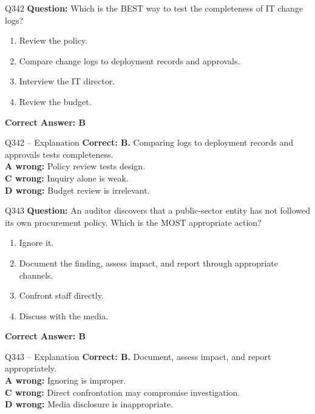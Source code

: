 \documentclass[aspectratio=169,10pt]{beamer}
\begin{document}
	\begin{frame}[t]{Q342}
		\small
		\textbf{Question:} Which is the BEST way to test the completeness of IT change logs?
		\begin{enumerate}[label=\Alph*.,itemsep=1pt,topsep=2pt]
			\item Review the policy.
			\item Compare change logs to deployment records and approvals.
			\item Interview the IT director.
			\item Review the budget.
		\end{enumerate}
		\vspace{4pt}
		\textbf{Correct Answer: B}
	\end{frame}
	
	\begin{frame}[t]{Q342 -- Explanation}
		\small
		\textbf{Correct: B.} Comparing logs to deployment records and approvals tests completeness. \\[4pt]
		\textbf{A wrong:} Policy review tests design. \\[2pt]
		\textbf{C wrong:} Inquiry alone is weak. \\[2pt]
		\textbf{D wrong:} Budget review is irrelevant.
	\end{frame}
	
	\begin{frame}[t]{Q343}
		\small
		\textbf{Question:} An auditor discovers that a public-sector entity has not followed its own procurement policy. Which is the MOST appropriate action?
		\begin{enumerate}[label=\Alph*.,itemsep=1pt,topsep=2pt]
			\item Ignore it.
			\item Document the finding, assess impact, and report through appropriate channels.
			\item Confront staff directly.
			\item Discuss with the media.
		\end{enumerate}
		\vspace{4pt}
		\textbf{Correct Answer: B}
	\end{frame}
	
	\begin{frame}[t]{Q343 -- Explanation}
		\small
		\textbf{Correct: B.} Document, assess impact, and report appropriately. \\[4pt]
		\textbf{A wrong:} Ignoring is improper. \\[2pt]
		\textbf{C wrong:} Direct confrontation may compromise investigation. \\[2pt]
		\textbf{D wrong:} Media disclosure is inappropriate.
	\end{frame}
	
\end{document}
